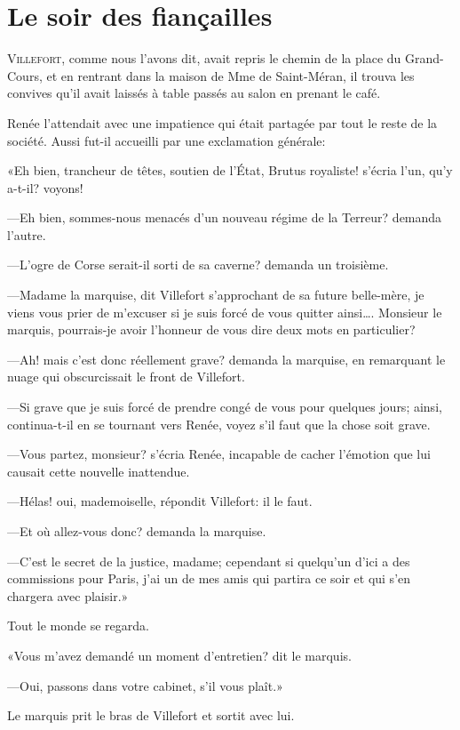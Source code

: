 \chapter{Le soir des fiançailles}

\lettrine{V}{illefort,} comme nous l'avons dit, avait repris le chemin de la place du Grand-Cours, et en rentrant dans la maison de Mme de Saint-Méran, il trouva les convives qu'il avait laissés à table passés au salon en prenant le café.

Renée l'attendait avec une impatience qui était partagée par tout le reste de la société. Aussi fut-il accueilli par une exclamation générale:

«Eh bien, trancheur de têtes, soutien de l'État, Brutus royaliste! s'écria l'un, qu'y a-t-il? voyons!

—Eh bien, sommes-nous menacés d'un nouveau régime de la Terreur? demanda l'autre.

—L'ogre de Corse serait-il sorti de sa caverne? demanda un troisième.

—Madame la marquise, dit Villefort s'approchant de sa future belle-mère, je viens vous prier de m'excuser si je suis forcé de vous quitter ainsi\dots. Monsieur le marquis, pourrais-je avoir l'honneur de vous dire deux mots en particulier?

—Ah! mais c'est donc réellement grave? demanda la marquise, en remarquant le nuage qui obscurcissait le front de Villefort.

—Si grave que je suis forcé de prendre congé de vous pour quelques jours; ainsi, continua-t-il en se tournant vers Renée, voyez s'il faut que la chose soit grave.

—Vous partez, monsieur? s'écria Renée, incapable de cacher l'émotion que lui causait cette nouvelle inattendue.

—Hélas! oui, mademoiselle, répondit Villefort: il le faut.

—Et où allez-vous donc? demanda la marquise.

—C'est le secret de la justice, madame; cependant si quelqu'un d'ici a des commissions pour Paris, j'ai un de mes amis qui partira ce soir et qui s'en chargera avec plaisir.»

Tout le monde se regarda.

«Vous m'avez demandé un moment d'entretien? dit le marquis.

—Oui, passons dans votre cabinet, s'il vous plaît.»

Le marquis prit le bras de Villefort et sortit avec lui.

